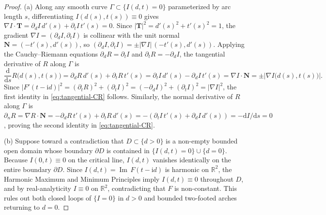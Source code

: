 \documentclass[11pt,reqno]{amsart}
\theoremstyle{definition}
\theoremstyle{remark}
\numberwithin{equation}{section}
\newcommand{\dd}{\mathrm{d}}
\newcommand{\ii}{\mathrm{i}}
\newcommand{\ImPt}{\operatorname{Im}}
\begin{document}
\begin{proof}
(a) Along any smooth curve $\Gamma \subset \{I(d,t)=0\}$ parameterized by arc length $s$, differentiating $I(d(s),t(s)) \equiv 0$ gives $\nabla I \cdot \mathbf{T} = \partial_d I\,d'(s) + \partial_t I\,t'(s) = 0$. Since $|\mathbf{T}|^2 = d'(s)^2 + t'(s)^2 = 1$, the gradient $\nabla I = (\partial_d I, \partial_t I)$ is collinear with the unit normal $\mathbf{N} = (-t'(s),d'(s))$, so $(\partial_d I, \partial_t I) = \pm |\nabla I|\,(-t'(s),d'(s))$. Applying the Cauchy--Riemann equations $\partial_d R = \partial_t I$ and $\partial_t R = -\partial_d I$, the tangential derivative of $R$ along $\Gamma$ is
\[
\frac{\dd}{\dd s}R\bigl(d(s),t(s)\bigr) = \partial_d R\,d'(s) + \partial_t R\,t'(s) = \partial_t I\,d'(s) - \partial_d I\,t'(s) = \nabla I \cdot \mathbf{N} = \pm \bigl|\nabla I\bigl(d(s),t(s)\bigr)\bigr|.
\]
Since $|F'(t-\ii d)|^2 = (\partial_t R)^2 + (\partial_t I)^2 = (-\partial_d I)^2 + (\partial_t I)^2 = |\nabla I|^2$, the first identity in \eqref{eq:tangential-CR} follows. Similarly, the normal derivative of $R$ along $\Gamma$ is $\partial_n R = \nabla R \cdot \mathbf{N} = -\partial_d R\,t'(s) + \partial_t R\,d'(s) = -(\partial_t I\,t'(s) + \partial_d I\,d'(s)) = -\dd I/\dd s = 0$, proving the second identity in \eqref{eq:tangential-CR}.

(b) Suppose toward a contradiction that $D \subset \{d > 0\}$ is a non-empty bounded open domain whose boundary $\partial D$ is contained in $\{I(d,t)=0\} \cup \{d=0\}$. Because $I(0,t) \equiv 0$ on the critical line, $I(d,t)$ vanishes identically on the entire boundary $\partial D$. Since $I(d,t) = \ImPt\,F(t-\ii d)$ is harmonic on $\mathbb{R}^2$, the Harmonic Maximum and Minimum Principles imply $I(d,t) \equiv 0$ throughout $D$, and by real-analyticity $I \equiv 0$ on $\mathbb{R}^2$, contradicting that $F$ is non-constant. This rules out both closed loops of $\{I=0\}$ in $d>0$ and bounded two-footed arches returning to $d=0$.


\end{proof}
\end{document}
